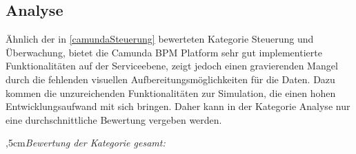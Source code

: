 \subsection{Analyse}

 Ähnlich der in \ref{camundaSteuerung} bewerteten Kategorie Steuerung und Überwachung, bietet die Camunda BPM Platform sehr gut implementierte Funktionalitäten auf der Serviceebene, zeigt jedoch einen gravierenden Mangel durch die fehlenden visuellen Aufbereitungsmöglichkeiten für die Daten. Dazu kommen die unzureichenden Funktionalitäten zur Simulation, die einen hohen Entwicklungsaufwand mit sich bringen. 
 Daher kann in der Kategorie Analyse nur eine durchschnittliche Bewertung vergeben werden.

\bigskip{},5cm\textit{Bewertung der Kategorie gesamt:} \hspace{5mm} \textcircled{}
\leftskip=0cm

